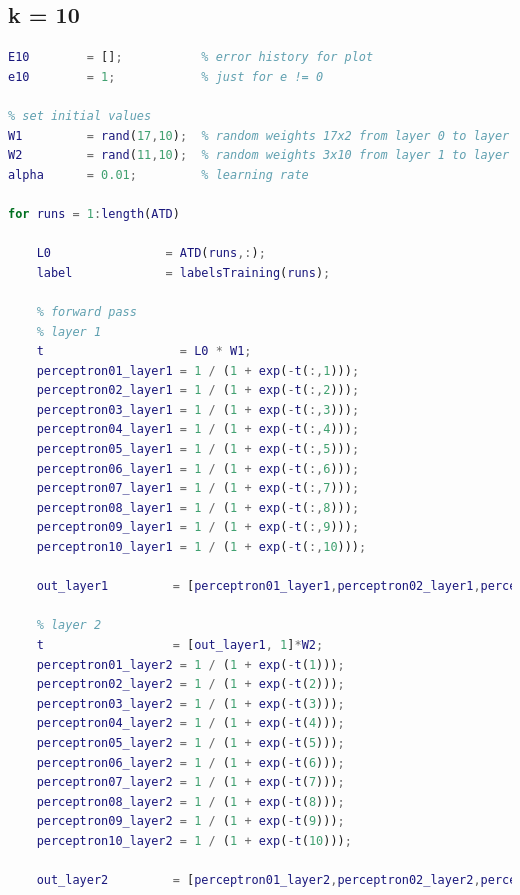 \documentclass[12pt]{article}
\begin{document}
\subsection{k = 10}
\begin{lstlisting}[language=Matlab]
% k = 10, Training
E10        = [];           % error history for plot
e10        = 1;            % just for e != 0

% set initial values
W1         = rand(17,10);  % random weights 17x2 from layer 0 to layer 1
W2         = rand(11,10);  % random weights 3x10 from layer 1 to layer 2
alpha      = 0.01;         % learning rate

for runs = 1:length(ATD)
    
    L0                = ATD(runs,:);
    label             = labelsTraining(runs);
        
    % forward pass
    % layer 1
    t                   = L0 * W1;
    perceptron01_layer1 = 1 / (1 + exp(-t(:,1)));
    perceptron02_layer1 = 1 / (1 + exp(-t(:,2)));
    perceptron03_layer1 = 1 / (1 + exp(-t(:,3)));
    perceptron04_layer1 = 1 / (1 + exp(-t(:,4)));
    perceptron05_layer1 = 1 / (1 + exp(-t(:,5)));
    perceptron06_layer1 = 1 / (1 + exp(-t(:,6)));
    perceptron07_layer1 = 1 / (1 + exp(-t(:,7)));
    perceptron08_layer1 = 1 / (1 + exp(-t(:,8)));
    perceptron09_layer1 = 1 / (1 + exp(-t(:,9)));
    perceptron10_layer1 = 1 / (1 + exp(-t(:,10)));
    
    out_layer1         = [perceptron01_layer1,perceptron02_layer1,perceptron03_layer1,perceptron04_layer1,perceptron05_layer1,perceptron06_layer1,perceptron07_layer1,perceptron08_layer1,perceptron09_layer1,perceptron10_layer1];
    
    % layer 2
    t                  = [out_layer1, 1]*W2;
    perceptron01_layer2 = 1 / (1 + exp(-t(1)));
    perceptron02_layer2 = 1 / (1 + exp(-t(2)));
    perceptron03_layer2 = 1 / (1 + exp(-t(3)));
    perceptron04_layer2 = 1 / (1 + exp(-t(4)));
    perceptron05_layer2 = 1 / (1 + exp(-t(5)));
    perceptron06_layer2 = 1 / (1 + exp(-t(6)));
    perceptron07_layer2 = 1 / (1 + exp(-t(7)));
    perceptron08_layer2 = 1 / (1 + exp(-t(8)));
    perceptron09_layer2 = 1 / (1 + exp(-t(9)));
    perceptron10_layer2 = 1 / (1 + exp(-t(10)));
    
    out_layer2         = [perceptron01_layer2,perceptron02_layer2,perceptron03_layer2,perceptron04_layer2,perceptron05_layer2, perceptron06_layer2,perceptron07_layer2,perceptron08_layer2,perceptron09_layer2,perceptron10_layer2];
    

\end{lstlisting}
\end{document}
